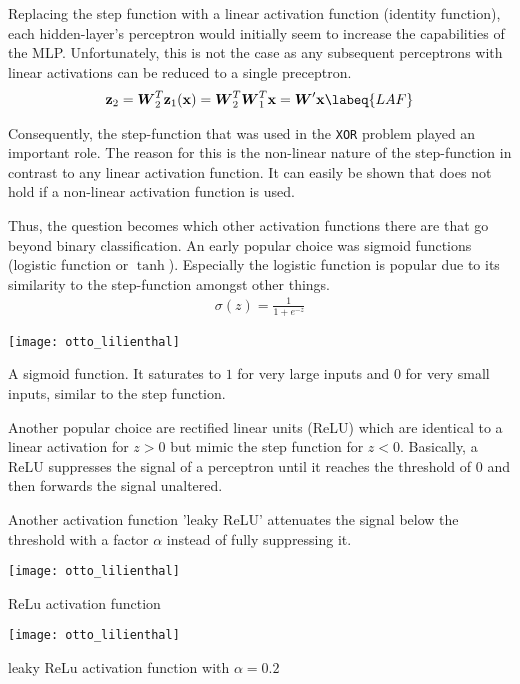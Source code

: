 Replacing the step function with a linear activation function (\ie identity function), each hidden-layer's perceptron would initially seem to increase the capabilities of the MLP.
Unfortunately, this is not the case as any subsequent perceptrons with linear activations can be reduced to a single preceptron.
\begin{align}
    \vec{z}_2 = \mat{W}^T_2 \vec{z}_1(\vec{x}) = \mat{W}^T_2 \mat{W}^T_1 \vec{x} = \mat{W}' \vec{x}
    \labeq{LAF}
\end{align}

Consequently, the step-function that was used in the \lstinline|XOR| problem played an important role.
The reason for this is the non-linear nature of the step-function in contrast to any linear activation function.
It can easily be shown that  does not hold if a non-linear activation function is used.

Thus, the question becomes which other activation functions there are that go beyond binary classification.
An early popular choice was sigmoid functions (logistic function or $\tanh$).
Especially the logistic function is popular due to its similarity to the step-function amongst other things.
\begin{align}
    \sigma(z) = \frac{1}{1 + e^{-z}}
\end{align}
\begin{marginfigure}
    \texttt{[image: otto\_lilienthal]}
    \caption[]{A sigmoid function. It saturates to $1$ for very large inputs and $0$ for very small inputs, similar to the step function.}
\end{marginfigure}

Another popular choice are rectified linear units (ReLU) which are identical to a linear activation for $z > 0$ but mimic the step function for $z < 0$.
Basically, a ReLU suppresses the signal of a perceptron until it reaches the threshold of $0$ and then forwards the signal unaltered.

Another activation function 'leaky ReLU' attenuates the signal below the threshold with a factor $\alpha$ instead of fully suppressing it.
\begin{marginfigure}
    \texttt{[image: otto\_lilienthal]}
    \caption[]{ReLu activation function}
\end{marginfigure}
\begin{marginfigure}
    \texttt{[image: otto\_lilienthal]}
    \caption[]{leaky ReLu activation function with $\alpha = 0.2$}
\end{marginfigure}


